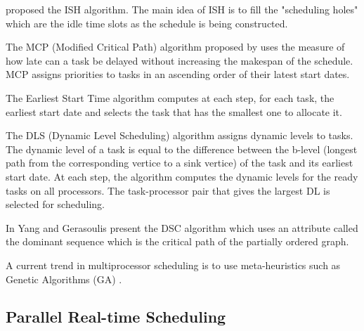 \cite{kruatrachue:1987} proposed the ISH algorithm. The main idea of ISH is to fill the "scheduling holes"  which are the idle time slots as the schedule is being constructed.

The MCP (Modified Critical Path) algorithm proposed by \cite{wu:1990} uses the measure of how late can a task be delayed without increasing the makespan of the schedule. MCP assigns priorities to tasks in an ascending order of their latest start dates. 

The Earliest Start Time algorithm \cite{hwang:1989} computes at each step, for each task, the earliest start date and selects the task that has the smallest one to allocate it. 

The DLS (Dynamic Level Scheduling) algorithm \cite{sih:1993} assigns dynamic levels to tasks. The dynamic level of a task is equal to the difference between the b-level (longest path from the corresponding vertice to a sink vertice) of the task and its earliest start date. At each step, the algorithm computes the dynamic levels for the ready tasks on all processors. The task-processor pair that gives the largest DL is selected for scheduling. 

In \cite{yang:1994} Yang and Gerasoulis present the DSC algorithm which uses an attribute called the dominant sequence which is the critical path of the partially ordered graph.

A current trend in multiprocessor scheduling is to use meta-heuristics such as Genetic Algorithms (GA) \cite{hou:1994, wu:2004, omara:2010}.

\subsection{Parallel Real-time Scheduling}

